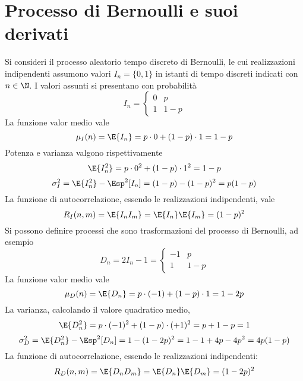 \section{Processo di Bernoulli e suoi derivati}
Si consideri il processo aleatorio tempo discreto di Bernoulli, le cui realizzazioni indipendenti assumono valori $I_n=\{0,1\}$ in istanti di tempo discreti indicati con $n\in\N$. I valori assunti si presentano con probabilità
\begin{equation}
	I_n=\begin{cases}
		0&p\\
		1&1-p
	\end{cases}
\end{equation}
La funzione valor medio vale
\begin{equation}
	\mu_I(n)=\E{I_n}=p\cdot 0+(1-p)\cdot 1=1-p
\end{equation}
Potenza e varianza valgono rispettivamente
\[
	\E{I^2_n}=p\cdot 0^2+(1-p)\cdot 1^2=1-p
\]
\begin{equation}
	\sigma^2_I=\E{I^2_n}-\Esp^2[I_n]=(1-p)-(1-p)^2=p(1-p)
\end{equation}
La funzione di autocorrelazione, essendo le realizzazioni indipendenti, vale
\begin{equation}
	R_I(n,m)=\E{I_n I_m}=\E{I_n}\E{I_m}=(1-p)^2
\end{equation}
Si possono definire processi che sono trasformazioni del processo di Bernoulli, ad esempio
\begin{equation}
	D_n=2I_n-1=\begin{cases}
		-1&p\\
		1&1-p
	\end{cases}
\end{equation}
La funzione valor medio vale
\begin{equation}
	\mu_D(n)=\E{D_n}=p\cdot (-1)+(1-p)\cdot 1=1-2p
\end{equation}
La varianza, calcolando il valore quadratico medio,
\[
	\E{D^2_n}=p\cdot (-1)^2+(1-p)\cdot (+1)^2=p+1-p=1
\]
\begin{equation}
	\sigma^2_D=\E{D^2_n}-\Esp^2[D_n]=1-(1-2p)^2=1-1+4p-4p^2=4p(1-p)
\end{equation}
La funzione di autocorrelazione, essendo le realizzazioni indipendenti:
\begin{equation}
	R_D(n,m)=\E{D_n D_m}=\E{D_n}\E{D_m}=(1-2p)^2
\end{equation}

